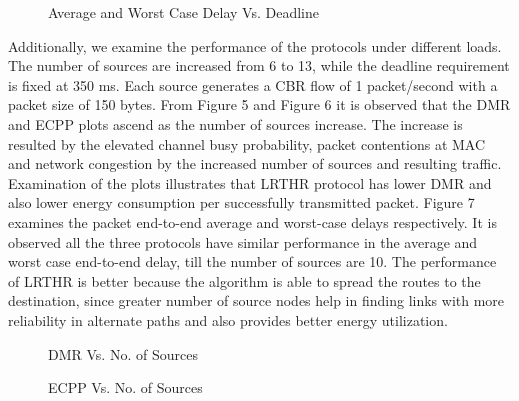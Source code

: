 \documentclass[fleqn,twoside]{article}
\begin{document}
\begin{figure}
\begin{center}
\begin{small}
\caption{Average and Worst Case Delay Vs. Deadline}
\end{small}
\end{center}
\end{figure}
\vskip 2mm
Additionally, we examine the performance of the protocols under different loads. The number of sources are increased from 6 to 13, 
while the deadline requirement is fixed at 350 ms. Each source generates a CBR flow of 1 packet/second with a packet size of 150 bytes. 
From Figure 5 and Figure 6 it is observed that the DMR and ECPP plots ascend as the number of sources increase. The increase is
resulted by the elevated channel busy probability, packet contentions at MAC and network congestion by the increased 
number of sources and resulting traffic. Examination of the plots illustrates that LRTHR protocol has
lower DMR and also lower energy consumption per successfully transmitted packet.
\vskip 2mm
Figure 7 examines the packet end-to-end average and worst-case delays respectively. It is observed all the three protocols have
similar performance in the average and worst case end-to-end delay, till the number of sources are 10. The performance of LRTHR is better because the algorithm is able to spread the routes to the destination, since greater number of source nodes help in finding
links with more reliability in alternate paths and also provides better energy utilization.



\begin{figure}
\begin{center}
\begin{small}
\caption{DMR Vs. No. of Sources}
\end{small}
\end{center}
\end{figure}




\begin{figure}
\begin{center}
\begin{small}
\caption{ECPP Vs. No. of Sources}
\end{small}
\end{center}
\end{figure}
\end{document}
